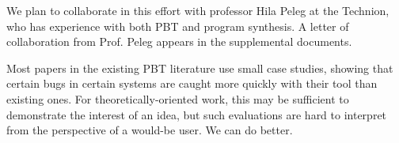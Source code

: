 We plan to collaborate in this effort with professor Hila
Peleg at the Technion, who has experience with both PBT and program synthesis. A
letter of collaboration from Prof.{} Peleg appears in the supplemental documents.



%
%
%
Most papers in the existing PBT literature use small case studies,
showing that certain bugs in certain systems
are caught more quickly with their tool than existing ones. For
theoretically-oriented work, this may be sufficient
to demonstrate the interest of an idea, but such evaluations
are hard to interpret from the perspective of a would-be user.
We can do better.

